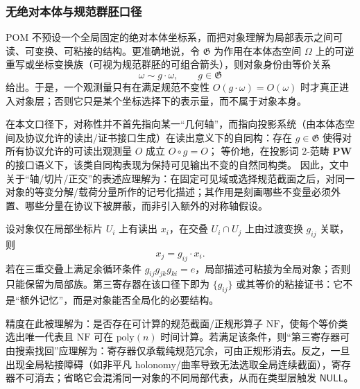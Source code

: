 \subsubsection{无绝对本体与规范群胚口径}\label{subsec:pom-gauge-groupoid}
POM 不预设一个全局固定的绝对本体坐标系，而把对象理解为局部表示之间可读、可变换、可粘接的结构。更准确地说，令 \(\mathfrak{G}\) 为作用在本体态空间 \(\Omega\) 上的可逆重写或坐标变换族（可视为规范群胚的可组合箭头），则对象身份由等价关系
\[
\omega\sim g\cdot\omega,\qquad g\in\mathfrak{G}
\]
给出。于是，一个观测量只有在满足规范不变性 \(O(g\cdot\omega)=O(\omega)\) 时才真正进入对象层；否则它只是某个坐标选择下的表示量，而不属于对象本身。

\begin{remark}\label{rem:symmetry-projection-automorphism}
在本文口径下，对称性并不首先指向某一“几何轴”，而指向投影系统（由本体态空间及协议允许的读出/证书接口生成）在读出意义下的自同构：存在 \(g\in\mathfrak{G}\) 使得对所有协议允许的可读出观测量 \(O\) 成立 \(O\circ g=O\)；
等价地，在投影词 \(2\)-范畴 \(\mathbf{PW}\) 的接口语义下，该类自同构表现为保持可见输出不变的自然同构类。
因此，文中关于“轴/切片/正交”的表述应理解为：在固定可见域或选择规范截面之后，对同一对象的等变分解/载荷分量所作的记号化描述；其作用是刻画哪些不变量必须外置、哪些分量在协议下被屏蔽，而非引入额外的对称轴假设。
\end{remark}

\begin{remark}[粘接数据与第三寄存器]\label{rem:pom-gauge-third-register}
设对象仅在局部坐标片 \(U_i\) 上有读出 \(x_i\)，在交叠 \(U_i\cap U_j\) 上由过渡变换 \(g_{ij}\) 关联，则
\[
x_j=g_{ij}\cdot x_i.
\]
若在三重交叠上满足余循环条件 \(g_{ij}g_{jk}g_{ki}=e\)，局部描述可粘接为全局对象；否则只能保留为局部族。第三寄存器在该口径下即为 \(\{g_{ij}\}\) 或其等价的粘接证书：它不是“额外记忆”，而是对象能否全局化的必要结构。
\end{remark}

\begin{remark}\label{rem:pom-gauge-normal-form}
精度在此被理解为：是否存在可计算的规范截面/正规形算子 \(\mathrm{NF}\)，使每个等价类选出唯一代表且 \(\mathrm{NF}\) 可在 \(\mathrm{poly}(n)\) 时间计算。若满足该条件，则“第三寄存器可由搜索找回”应理解为：寄存器仅承载纯规范冗余，可由正规形消去。反之，一旦出现全局粘接障碍（如非平凡 holonomy/曲率导致无法选取全局连续截面），寄存器不可消去；省略它会混淆同一对象的不同局部代表，从而在类型层触发 \(\mathsf{NULL}\)。
\end{remark}

